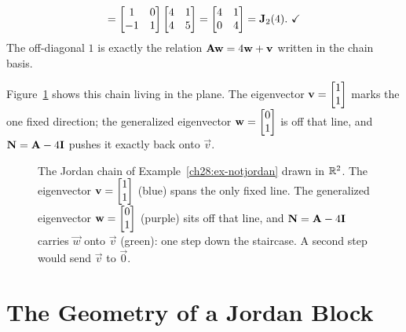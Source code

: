 \begin{example}
\[=\begin{bmatrix}1&0\\-1&1\end{bmatrix}\begin{bmatrix}4&1\\4&5\end{bmatrix}
=\begin{bmatrix}4&1\\0&4\end{bmatrix}=\mat{J}_2(4).\ \checkmark
\]
The off-diagonal $1$ is exactly the relation $\mathbf{A}\mathbf{w}=4\mathbf{w}+\mathbf{v}$ written in
the chain basis.
\end{example}

Figure~\ref{ch28:concrete-chain} shows this chain living in the plane. The eigenvector
$\mathbf{v}=\begin{bmatrix}1\\1\end{bmatrix}$ marks the one fixed direction; the generalized eigenvector
$\mathbf{w}=\begin{bmatrix}0\\1\end{bmatrix}$ is off that line, and $\mathbf{N}=\mathbf{A}-4\mathbf{I}$ pushes it exactly
back onto $\vec{v}$.

\begin{figure}[H]
\centering
{}
\caption{The Jordan chain of Example~\ref{ch28:ex-notjordan} drawn in $\mathbb{R}^2$. The
eigenvector $\mathbf{v}=\protect\begin{bmatrix}1\\1\end{bmatrix}$ (blue) spans the only fixed line. The
generalized eigenvector $\mathbf{w}=\protect\begin{bmatrix}0\\1\end{bmatrix}$ (purple) sits off that line, and
$\mathbf{N}=\mathbf{A}-4\mathbf{I}$ carries $\vec{w}$ onto $\vec{v}$ (green): one step
down the staircase. A second step would send $\vec{v}$ to $\vec{0}$.}
\label{ch28:concrete-chain}
\end{figure}

\section{The Geometry of a Jordan Block}
\label{ch28:geometry}

